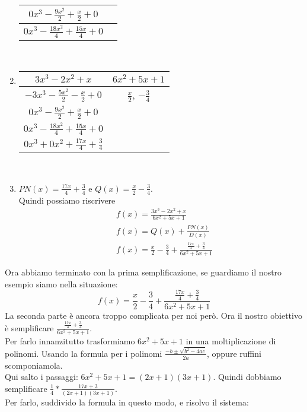 \documentclass[11pt]{article}
\begin{document}
\begin{enumerate}
\begin{tabular}{c|c}
        \hline
        $0x^3 -\frac{9x^{2}}{2} + \frac{x}{2} + 0$ & \\
        \hline
        $0x^3 -\frac{18x^{2}}{4} + \frac{15x}{4} + 0$ & \\
    \end{tabular}\\
    \item \begin{tabular}{c|c}
        $3x^3-2x^2+x$ & $6x^2+5x+1$\\
        \hline
        $-3x^3 -\frac{5x^{2}}{2} - \frac{x}{2} + 0$ & $\frac{x}{2}$, $-\frac{3}{4}$\\
        \hline
        $0x^3 -\frac{9x^{2}}{2} + \frac{x}{2} + 0$ & \\
        \hline
        $0x^3 -\frac{18x^{2}}{4} + \frac{15x}{4} + 0$ & \\
        \hline
        $0x^3 + 0x^{2} + \frac{17x}{4} + \frac{3}{4}$ & \\
    \end{tabular}\\
    \item $PN(x) = \frac{17x}{4} + \frac{3}{4}$ e $Q(x) = \frac{x}{2} - \frac{3}{4}$.\\
    Quindi possiamo riscrivere
    \begin{align*}
        &f(x) = \frac{3x^3-2x^2+x}{6x^2+5x+1}\\
        &f(x) = Q(x) + \frac{PN(x)}{D(x)}\\
        &f(x) = \frac{x}{2} - \frac{3}{4} + \frac{\frac{17x}{4} + \frac{3}{4}}{6x^2+5x+1}
    \end{align*} 
\end{enumerate}
Ora abbiamo terminato con la prima semplificazione, se guardiamo il nostro esempio siamo nella situazione: $$f(x) = \frac{x}{2} - \frac{3}{4} + \frac{\frac{17x}{4} + \frac{3}{4}}{6x^2+5x+1}$$
La seconda parte è ancora troppo complicata per noi però. Ora il nostro obiettivo è semplificare $\frac{\frac{17x}{4} + \frac{3}{4}}{6x^2+5x+1}$.\\
Per farlo innanzitutto trasformiamo $6x^{2}+5x+1$ in una moltiplicazione di polinomi. Usando la formula per i polinomi $\frac{-b \pm \sqrt{b^{2}-4ac}}{2a}$, oppure ruffini scomponiamola.\\
Qui salto i passaggi: $6x^{2}+5x+1 = (2x+1)(3x+1)$. Quindi dobbiamo semplificare $\frac{1}{4} * \frac{17x+3}{(2x+1)(3x+1)}$.\\
Per farlo, suddivido la formula in questo modo, e risolvo il sistema:\\
\end{document}
